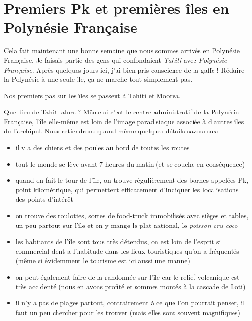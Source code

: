 \hypertarget{premiers-pk-et-premiuxe8res-uxeeles-en-polynuxe9sie-franuxe7aise}{%
\section{Premiers Pk et premières îles en Polynésie
Française}\label{premiers-pk-et-premiuxe8res-uxeeles-en-polynuxe9sie-franuxe7aise}}

Cela fait maintenant une bonne semaine que nous sommes arrivés en
Polynésie Française. Je faisais partie des gens qui confondaient
\emph{Tahiti} avec \emph{Polynésie Française}. Après quelques jours ici,
j'ai bien pris conscience de la gaffe ! Réduire la Polynésie à une seule
île, ça ne marche tout simplement pas.

Nos premiers pas sur les îles se passent à Tahiti et Moorea.

\hypertarget{mapid}{}

Que dire de Tahiti alors ? Même si c'est le centre administratif de la
Polynésie Française, l'île elle-même est loin de l'image paradisiaque
associée à d'autres îles de l'archipel. Nous retiendrons quand même
quelques détails savoureux:

\begin{itemize}
\tightlist
\item
  il y a des chiens et des poules au bord de toutes les routes
\item
  tout le monde se lève avant 7 heures du matin (et se couche en
  conséquence)
\item
  quand on fait le tour de l'île, on trouve régulièrement des bornes
  appelées Pk, point kilométrique, qui permettent efficacement
  d'indiquer les localisations des points d'intérêt
\item
  on trouve des roulottes, sortes de food-truck immobilisés avec sièges
  et tables, un peu partout sur l'île et on y mange le plat national, le
  \emph{poisson cru coco}
\item
  les habitants de l'île sont tous très détendus, on est loin de
  l'esprit si commercial dont a l'habitude dans les lieux touristiques
  qu'on a fréquentés (même si évidemment le tourisme est ici aussi une
  manne)
\item
  on peut également faire de la randonnée sur l'île car le relief
  volcanique est très accidenté (nous en avons profité et sommes montés
  à la cascade de Loti)
\item
  il n'y a pas de plages partout, contrairement à ce que l'on pourrait
  penser, il faut un peu chercher pour les trouver (mais elles sont
  souvent magnifiques)
\end{itemize}

